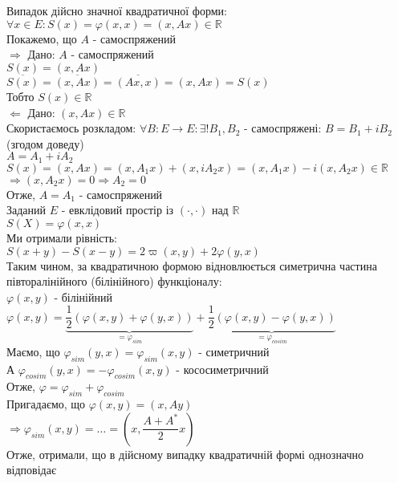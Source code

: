 \documentclass[a4paper, 10pt]{article}
\theoremstyle{theoremdd}
\begin{document}
Випадок дійсно значної квадратичної форми:\\
$\forall x \in E: S(x) = \varphi(x,x) = (x,Ax) \in \mathbb{R}$\\
Покажемо, що $A$ - самоспряжений\\
$\boxed{\Rightarrow}$ Дано: $A$ - самоспряжений\\
$S(x) = (x,Ax)$\\
$\overline{S(x)} = \overline{(x,Ax)} = \overline{(Ax,x)} = (x,Ax) = S(x)$\\
Тобто $S(x) \in \mathbb{R}$
\bigskip \\
$\boxed{\Leftarrow}$ Дано: $(x,Ax) \in \mathbb{R}$\\
Скористаємось розкладом: $\forall B: E \to E: \exists ! B_1,B_2$ - самоспряжені: $B = B_1 + i B_2$ (згодом доведу)\\
$A = A_1 + i A_2$\\
$S(x) = (x,Ax)= (x,A_1x) + (x,iA_2x) = (x,A_1x) - i(x,A_2x) \in \mathbb{R}$\\
$\Rightarrow (x,A_2x) = 0 \Rightarrow A_2 = 0$\\
Отже, $A = A_1$ - самоспряжений
\bigskip \\
Заданий $E$ - евклідовий простір із $(\cdot, \cdot)$ над $\mathbb{R}$\\
$S(X) = \varphi(x,x)$\\
Ми отримали рівність:\\
$S(x+y)-S(x-y) = 2\varpi(x,y) + 2\varphi(y,x)$\\
Таким чином, за квадратичною формою відновлюється симетрична частина півторалінійного (білінійного) функціоналу:\\
$\varphi(x,y)$ - білінійний\\
$\varphi(x,y) =  \underbrace{\dfrac{1}{2} \left(\varphi(x,y) + \varphi(y,x) \right)}_{= \varphi_{sim}} + \underbrace{\dfrac{1}{2} \left(\varphi(x,y) - \varphi(y,x) \right)}_{= \varphi_{cosim}}$\\
Маємо, що $\varphi_{sim}(y,x) = \varphi_{sim}(x,y)$ - симетричний\\
А $\varphi_{cosim}(y,x) = -\varphi_{cosim}(x,y)$ - кососиметричний\\
Отже, $\varphi = \varphi_{sim} + \varphi_{cosim}$\\
Пригадаємо, що $\varphi(x,y) = (x,Ay)$\\
$\Rightarrow \varphi_{sim}(x,y) = \dots = \left(x, \dfrac{A+A^*}{2}x \right)$\\
Отже, отримали, що в дійсному випадку квадратичній формі однозначно відповідає\\
\end{document}
